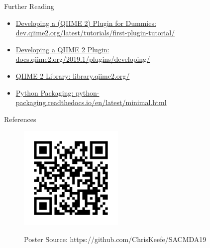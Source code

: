 \documentclass[final]{beamer}
\newlength{\sepwidth}
\newlength{\colwidth}
\newcommand{\separatorcolumn}{\begin{column}{\sepwidth}\end{column}}
\begin{document}
\begin{frame}[t]
\begin{columns}[t]
\begin{column}{\colwidth}
  \begin{block}{Further Reading}
    \begin{itemize}
      \item \href{https://dev.qiime2.org/latest/tutorials/first-plugin-tutorial/}{Developing a (QIIME 2) Plugin for Dummies: dev.qiime2.org/latest/tutorials/first-plugin-tutorial/}
      \item \href{https://docs.qiime2.org/2019.1/plugins/developing/}{Developing a QIIME 2 Plugin: docs.qiime2.org/2019.1/plugins/developing/}
      \item \href{https://library.qiime2.org/}{QIIME 2 Library: library.qiime2.org/}
      \item \href{https://python-packaging.readthedocs.io/en/latest/minimal.html}{Python Packaging: python-packaging.readthedocs.io/en/latest/minimal.html}
    \end{itemize}
  \end{block}

  \begin{block}{References}
    \nocite{*}
    
  \end{block}

  \begin{figure}
    \begin{minipage}[c]{\textwidth}
      \hfill
      \includegraphics[height=5cm]{assets/repo}
    \end{minipage}
    \begin{minipage}[c]{\textwidth}
      \hfill
      Poster Source: https://github.com/ChrisKeefe/SACMDA19
    \end{minipage}
  \end{figure}

\end{column}

\separatorcolumn
\end{columns}
\end{frame}
\end{document}
